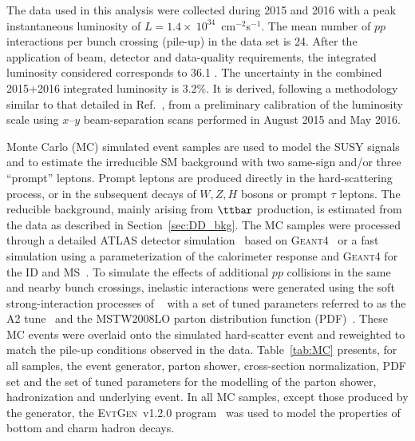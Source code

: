 The data used in this analysis were collected during 2015 and 2016 with a peak 
instantaneous luminosity of $L=1.4\times~10^{34}$~cm$^{-2}$s$^{-1}$. 
The mean number of $pp$ interactions per bunch crossing 
(pile-up) in the data set is 24. After the application of beam, detector and data-quality requirements, 
the integrated luminosity considered corresponds to 36.1 \ifb.
The uncertainty in the combined 2015+2016 integrated luminosity is 3.2\%. 
It is derived, following a methodology similar to that detailed in Ref.~\cite{Aaboud:2016hhf}, 
from a preliminary calibration of the luminosity scale using $x$--$y$ beam-separation scans performed in August 2015 and May 2016.

Monte Carlo (MC) simulated event samples are used to model the SUSY signals and to estimate the irreducible SM background with two 
same-sign and/or three ``prompt'' leptons. Prompt leptons are produced directly in the hard-scattering process, or in the subsequent decays 
of $W,Z,H$ bosons or prompt $\tau$ leptons. The reducible background, mainly 
arising from $\ttbar$ production, is estimated from the data as described in Section~\ref{sec:DD_bkg}. 
The MC samples were processed through a detailed ATLAS detector simulation~\cite{Aad:2010ah} based on 
\textsc{Geant4}~\cite{Agostinelli:2002hh} or a fast simulation using a parameterization of the calorimeter response 
and \textsc{Geant4} for the ID and MS~\cite{ATL-PHYS-PUB-2010-013}. To simulate the effects of additional $pp$ collisions 
in the same and nearby bunch crossings, inelastic interactions were generated using the soft strong-interaction processes 
of ~\cite{Sjostrand:2007gs} with a set of tuned parameters referred to as the A2 tune~\cite{ATL-PHYS-PUB-2012-003} and the MSTW2008LO parton 
distribution function (PDF)~\cite{Martin:2009iq}. These MC events were overlaid onto the simulated hard-scatter event 
and reweighted to match the pile-up conditions observed in the data. 
Table~\ref{tab:MC} presents, for all samples, the event generator, parton shower, cross-section normalization, PDF
set and the set of tuned parameters for the modelling of the parton shower, hadronization and underlying event. 
In all MC samples, except those produced by the \SHERPA generator, 
the \textsc{EvtGen}~v1.2.0 program~\cite{EvtGen} was used 
to model the properties of bottom and charm hadron decays. 

